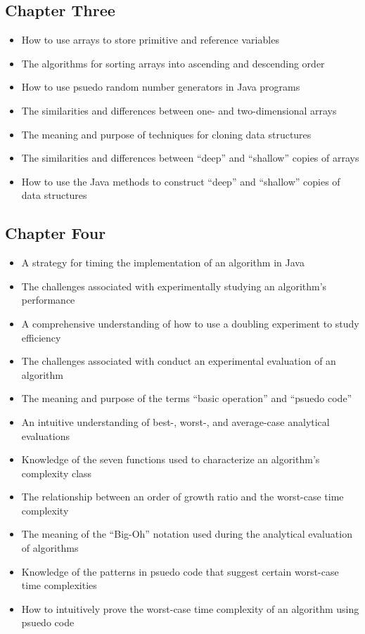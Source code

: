 \documentclass[11pt]{article}
\begin{document}
\vspace*{-.2in}
\subsection*{Chapter Three}

\begin{itemize}

  \item How to use arrays to store primitive and reference variables
  \item The algorithms for sorting arrays into ascending and descending order
  \item How to use psuedo random number generators in Java programs
  \item The similarities and differences between one- and two-dimensional arrays
  \item The meaning and purpose of techniques for cloning data structures
  \item The similarities and differences between ``deep'' and ``shallow'' copies
    of arrays
  \item How to use the Java methods to construct ``deep'' and ``shallow'' copies
    of data structures

\end{itemize}

\vspace*{-.2in}
\subsection*{Chapter Four}

\begin{itemize}

  \item A strategy for timing the implementation of an algorithm in Java
  \item The challenges associated with experimentally studying an algorithm's
    performance
  \item A comprehensive understanding of how to use a doubling experiment to
    study efficiency
  \item The challenges associated with conduct an experimental evaluation of an
    algorithm
  \item The meaning and purpose of the terms ``basic operation'' and ``psuedo code''
  \item An intuitive understanding of best-, worst-, and average-case analytical
    evaluations
  \item Knowledge of the seven functions used to characterize an algorithm's
    complexity class
  \item The relationship between an order of growth ratio and the worst-case
    time complexity
  \item The meaning of the ``Big-Oh'' notation used during the
    analytical evaluation of algorithms
  \item Knowledge of the patterns in psuedo code that suggest certain
    worst-case time complexities
  \item How to intuitively prove the worst-case time complexity of an algorithm
    using psuedo code

\end{itemize}
\end{document}
